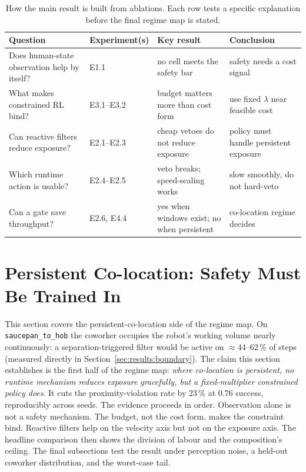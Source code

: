 \documentclass[11pt,a4paper]{report}
\begin{document}
\begin{table}[htbp]
\centering
\small
\caption{How the main result is built from ablations. Each row tests a
specific explanation before the final regime map is stated.}
\label{tab:results-evidence-map}
\begin{tabular}{@{}p{}p{}p{}p{}@{}}
\toprule
Question & Experiment(s) & Key result & Conclusion \\
\midrule
Does human-state observation help by itself? & E1.1 & no cell meets the safety bar & safety needs a cost signal \\
What makes constrained RL bind? & E3.1--E3.2 & budget matters more than cost form & use fixed $\lambda$ near feasible cost \\
Can reactive filters reduce exposure? & E2.1--E2.3 & cheap vetoes do not reduce exposure & policy must handle persistent exposure \\
Which runtime action is usable? & E2.4--E2.5 & veto breaks; speed-scaling works & slow smoothly, do not hard-veto \\
Can a gate save throughput? & E2.6, E4.4 & yes when windows exist; no when persistent & co-location regime decides \\
\bottomrule
\end{tabular}
\end{table}

\section{Persistent Co-location: Safety Must Be Trained In}
\label{sec:results:r1}

This section covers the persistent-co-location side of the regime map. On
\texttt{saucepan\_to\_hob} the coworker occupies the robot's working
volume nearly continuously: a separation-triggered filter would be
active on $\approx$44--62\,\% of steps (measured directly in
Section~\ref{sec:results:boundary}). The claim this section
establishes is the first half of the regime map: \emph{where
co-location is persistent, no runtime mechanism reduces exposure
gracefully, but a fixed-multiplier constrained policy does}. It cuts
the proximity-violation rate by $23\,\%$ at $0.76$ success, reproducibly
across seeds. The evidence proceeds in order. Observation alone is not
a safety mechanism. The budget, not the cost form, makes the
constraint bind. Reactive filters help on the velocity axis but not on
the exposure axis. The headline comparison then shows the division of
labour and the composition's ceiling. The final subsections test the
result under perception noise, a held-out coworker distribution, and
the worst-case tail.
\end{document}
